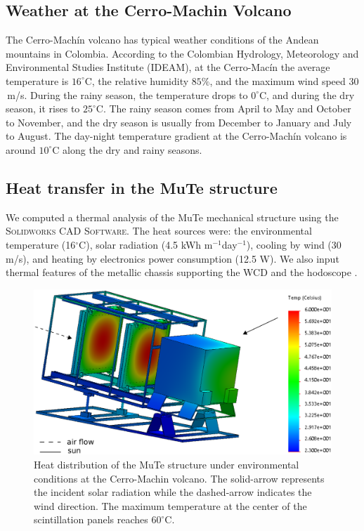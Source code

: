 \documentclass[a4paper,11pt]{article}
\begin{document}
\subsection{Weather at the Cerro-Machin Volcano}

The Cerro-Mach\'in volcano has typical weather conditions of the Andean mountains in Colombia. According to the Colombian Hydrology, Meteorology and Environmental Studies Institute (IDEAM), at the Cerro-Mac\'in the average temperature is $16^{\circ}$C, the relative humidity $85\%$, and the maximum wind speed $30$\,m/s. During the rainy season, the temperature drops to $0^{\circ}$C, and during the dry season, it rises to $25^{\circ}$C. The rainy season comes from April to May and October to November, and the dry season is usually from December to January and July to August. The day-night temperature gradient at the Cerro-Mach\'in volcano is around $10^{\circ}$C along the dry and rainy seasons.

\subsection{Heat transfer in the MuTe structure}

We computed a thermal analysis of the MuTe mechanical structure using the \textsc{Solidworks CAD Software}. The heat sources were: the environmental temperature (16$^{\circ}$C), solar radiation (4.5 kWh m$^{-1}$day$^{-1}$), cooling by wind (30 m/s), and heating by electronics power consumption (12.5 W). We also input thermal features of the metallic chassis supporting the WCD and the hodoscope \cite{penarodriguez2020}.

\begin{figure}[htbp]
\centering 
\includegraphics[width=.7\textwidth]{Figures/MuTe_Temp.eps}
\caption{Heat distribution of the MuTe structure under environmental conditions at the Cerro-Machin volcano. The solid-arrow represents the incident solar radiation while the dashed-arrow indicates the wind direction. The maximum temperature at the center of the scintillation panels reaches $60^{\circ}$C. }
\label{fig:detec} 
\end{figure}
\end{document}
